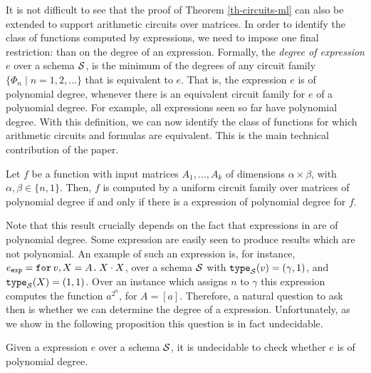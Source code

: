 
It is not difficult to see that the proof of Theorem \ref{th-circuits-ml} can also be extended to support arithmetic circuits over matrices. In order to identify the class of functions computed by \langfor expressions, we need to impose one final restriction: than on the degree of an expression. Formally, the \textit{degree of \langfor expression $e$} over a schema $\mathcal{S}$, is the minimum of the degrees of any circuit family  $\{\Phi_n\mid n=1,2,\ldots\}$ that is equivalent to $e$. That is, the expression $e$ is of polynomial degree, whenever there is an equivalent circuit family for $e$ of a polynomial degree.  
For example, all \langfor expressions seen so far have polynomial degree.
With this definition, we can now identify the class of functions for which arithmetic circuits and \langfor formulas are equivalent. This is the main technical contribution of the paper. 

\begin{corollary}
\label{th-equivalence}
Let $f$ be a function with input matrices $A_1,\ldots ,A_k$ of dimensions $\alpha\times \beta$, with $\alpha,\beta \in \{n,1\}$. Then, $f$ is computed by a uniform circuit family over matrices of polynomial degree if and only if there is a \langfor expression of polynomial degree for $f$. 
\end{corollary}

Note that this result crucially depends on the fact that expressions in \langfor are of polynomial degree. Some \langfor expression are easily seen to produce results which are not polynomial. An example of such an expression is, for instance, $e_{\texttt{exp}} = \texttt{for}\, v,X=A \texttt{.}\, X\cdot X$, over a schema $\mathcal{S}$ with $\texttt{type}_{\mathcal{S}}(v)= (\gamma,1)$, and $\texttt{type}_{\mathcal{S}}(X)=(1,1)$. Over an instance which assigns $n$ to $\gamma$ this expression computes the function $a^{2^n}$, for $A=[a]$. Therefore, a natural question to ask then is whether we can determine the degree of a \langfor expression. Unfortunately, as we show in the following proposition this question is in fact undecidable.

\begin{proposition}
\label{prop-undec}
Given a \langfor expression $e$ over a schema $\mathcal{S}$, it is undecidable to check whether $e$ is of polynomial degree.
\end{proposition}

